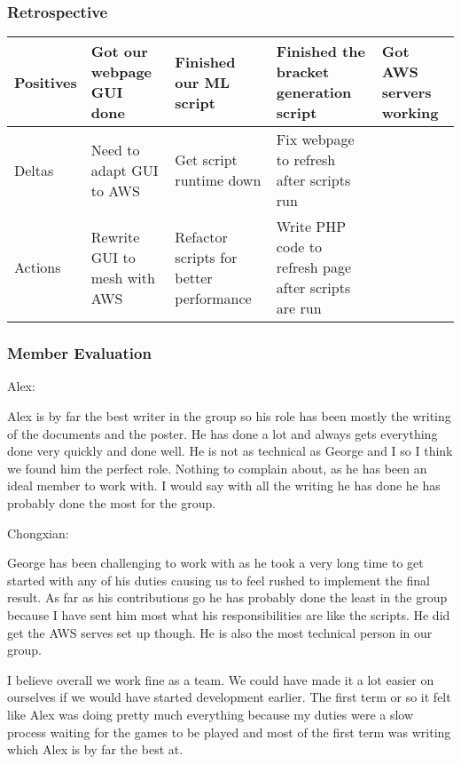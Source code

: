\documentclass[letterpaper, 10pt,titlepage]{article}
\begin{document}
\subsubsection{Retrospective}
\begin{center}
\begin{tabular}{ | m{.3em} | m{.3cm}| m{.3cm} | } 
\hline
Positives& Got our webpage GUI done & Finished our ML script & Finished the bracket generation script & Got AWS servers working\\ 
\hline
Deltas & Need to adapt GUI to AWS & Get script runtime down & Fix webpage to refresh after scripts run \\ 
\hline
Actions & Rewrite GUI to mesh with AWS & Refactor scripts for better performance & Write PHP code to refresh page after scripts are run \\ 
\hline
\end{tabular}
\end{center}



\subsubsection{Member Evaluation}
Alex: 
\par Alex is by far the best writer in the group so his role has been mostly the writing of the documents and the poster.  He has done a lot and always gets everything done very quickly and done well.  He is not as technical as George and I so I think we found him the perfect role. Nothing to complain about, as he has been an ideal member to work with. I would say with all the writing he has done he has probably done the most for the group.

Chongxian: 
\par George has been challenging to work with as he took a very long time to get started with any of his duties causing us to feel rushed to implement the final result. As far as his contributions go he has probably done the least in the group because I have sent him most what his responsibilities are like the scripts. He did get the AWS serves set up though. He is also the most technical person in our group. 

\par I believe overall we work fine as a team. We could have made it a lot easier on ourselves if we would have started development earlier.  The first term or so it felt like Alex was doing pretty much everything because my duties were a slow process waiting for the games to be played and most of the first term was writing which Alex is by far the best at.
\end{document}

